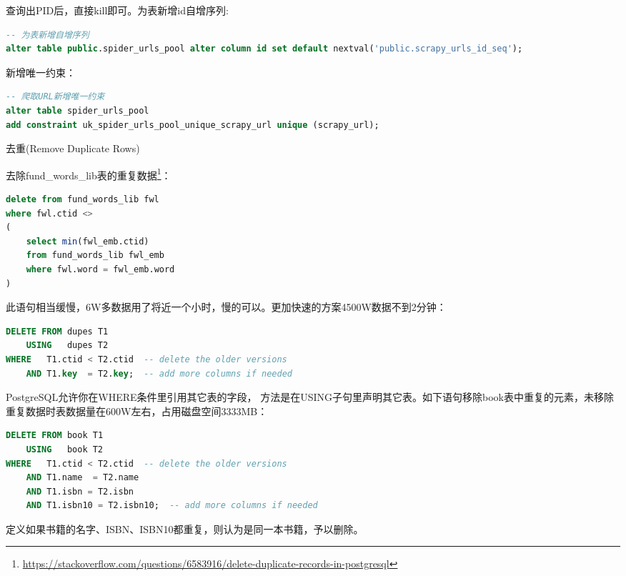 \documentclass[8pt]{book}
\makeatletter
\numberwithin{dummy}{section}
\theoremstyle{ocrenumbox}
\theoremstyle{blacknumex}
\theoremstyle{blacknumbox}
\theoremstyle{ocrenum}
\renewcommand\paragraph{\@startsection{paragraph}{4}{\z@}
	{-2ex \@plus-.2ex \@minus .2ex}
	{.1ex}
	{\normalfont\small\sffamily\bfseries}}
\makeatother
\begin{document}
查询出PID后，直接kill即可。为表新增id自增序列:

\begin{lstlisting}[language=SQL]
-- 为表新增自增序列
alter table public.spider_urls_pool alter column id set default nextval('public.scrapy_urls_id_seq');
\end{lstlisting}

新增唯一约束：

\begin{lstlisting}[language=SQL]
-- 爬取URL新增唯一约束
alter table spider_urls_pool 
add constraint uk_spider_urls_pool_unique_scrapy_url unique (scrapy_url);
\end{lstlisting}

\paragraph{去重(Remove Duplicate Rows)}

去除fund\_words\_lib表的重复数据\footnote{\url{https://stackoverflow.com/questions/6583916/delete-duplicate-records-in-postgresql}}：

\begin{lstlisting}[language=SQL]
delete from fund_words_lib fwl
where fwl.ctid <>
(
	select min(fwl_emb.ctid)
	from fund_words_lib fwl_emb
	where fwl.word = fwl_emb.word
)
\end{lstlisting}

此语句相当缓慢，6W多数据用了将近一个小时，慢的可以。更加快速的方案4500W数据不到2分钟：

\begin{lstlisting}[language=SQL]
DELETE FROM dupes T1
    USING   dupes T2
WHERE   T1.ctid < T2.ctid  -- delete the older versions
    AND T1.key  = T2.key;  -- add more columns if needed
\end{lstlisting}

PostgreSQL允许你在WHERE条件里引用其它表的字段， 方法是在USING子句里声明其它表。如下语句移除book表中重复的元素，未移除重复数据时表数据量在600W左右，占用磁盘空间3333MB：

\begin{lstlisting}[language=SQL]
DELETE FROM book T1
    USING   book T2
WHERE   T1.ctid < T2.ctid  -- delete the older versions
    AND T1.name  = T2.name
	AND T1.isbn = T2.isbn
	AND T1.isbn10 = T2.isbn10;  -- add more columns if needed
\end{lstlisting}

定义如果书籍的名字、ISBN、ISBN10都重复，则认为是同一本书籍，予以删除。
\end{document}

